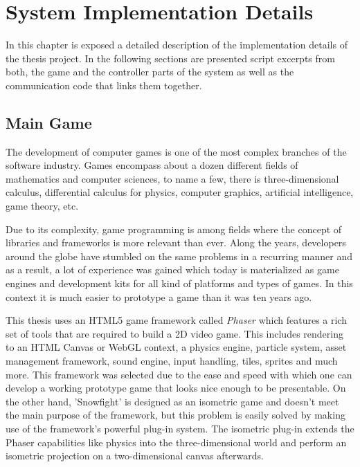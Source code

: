 \section{System Implementation Details}

In this chapter is exposed a detailed description of the implementation details
of the thesis project. In the following sections are presented script excerpts
from both, the game and the controller parts of the system as well as the
communication code that links them together.

\subsection{Main Game}

The development of computer games is one of the most complex branches of the
software industry. Games encompass about a dozen different fields of mathematics
and computer sciences, to name a few, there is three-dimensional calculus,
differential calculus for physics, computer graphics, artificial intelligence,
game theory, etc.

Due to its complexity, game programming is among fields where the concept of
libraries and frameworks is more relevant than ever. Along the years, developers
around the globe have stumbled on the same problems in a recurring manner and as
a result, a lot of experience was gained which today is materialized as game
engines and development kits for all kind of platforms and types of games. In
this context it is much easier to prototype a game than it was ten years ago.

This thesis uses an HTML5 game framework called \emph{Phaser}\cite{phaser} which features a
rich set of tools that are required to build a 2D video game. This includes
rendering to an HTML Canvas or WebGL context, a physics engine, particle system,
asset management framework, sound engine, input handling, tiles, sprites and
much more. This framework was selected due to the ease and speed with which one
can develop a working prototype game that looks nice enough to be presentable.
On the other hand, 'Snowfight' is designed as an isometric game and doesn't meet
the main purpose of the framework, but this problem is easily solved by making
use of the framework's powerful plug-in system. The isometric plug-in extends
the Phaser capabilities like physics into the three-dimensional world and
perform an isometric projection on a two-dimensional canvas afterwards.




